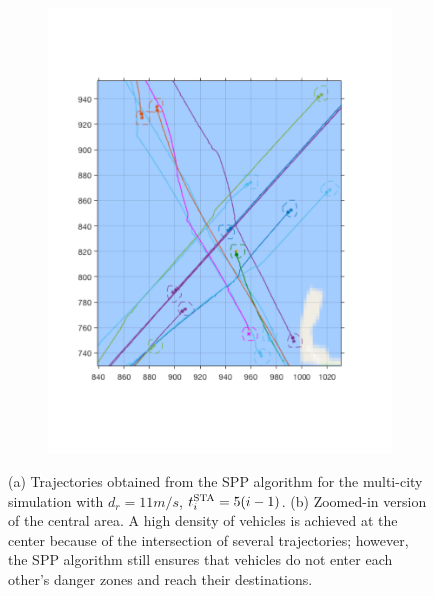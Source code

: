 \begin{figure}[!htb]
\begin{subfigure}{\columnwidth}
  \includegraphics[width=\columnwidth]{figs/bayArea_d11sep5_zoomed}
  \subcaption{}
  \label{fig:bayArea_d11sep5_zoomed}
\end{subfigure}%
  \caption{(a) Trajectories obtained from the SPP algorithm for the multi-city simulation with $d_r = 11m/s$, $t^\text{STA}_i = 5(i-1)$. (b) Zoomed-in version of the central area. A high density of vehicles is achieved at the center because of the intersection of several trajectories; however, the SPP algorithm still ensures that vehicles do not enter each other's danger zones and reach their destinations.} 
  \label{fig:bayArea_d11sep5_all}
\end{figure}

